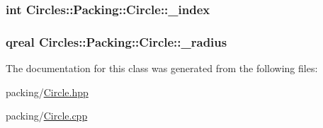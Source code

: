 \subsubsection[{\+\_\+index}]{\setlength{\rightskip}{0pt plus 5cm}int Circles\+::\+Packing\+::\+Circle\+::\+\_\+index\hspace{0.3cm}{\ttfamily [protected]}}\label{class_circles_1_1_packing_1_1_circle_aaaa8e4949e8c12f7411b8f1eb9fa329c}
\hypertarget{class_circles_1_1_packing_1_1_circle_a357d2e553896a5838f871c2befcd4a5b}{}
\subsubsection[{\+\_\+radius}]{\setlength{\rightskip}{0pt plus 5cm}qreal Circles\+::\+Packing\+::\+Circle\+::\+\_\+radius\hspace{0.3cm}{\ttfamily [protected]}}\label{class_circles_1_1_packing_1_1_circle_a357d2e553896a5838f871c2befcd4a5b}


The documentation for this class was generated from the following files\+:\begin{DoxyCompactItemize}
\item 
packing/\hyperlink{packing_2_circle_8hpp}{Circle.\+hpp}\item 
packing/\hyperlink{packing_2_circle_8cpp}{Circle.\+cpp}\end{DoxyCompactItemize}
